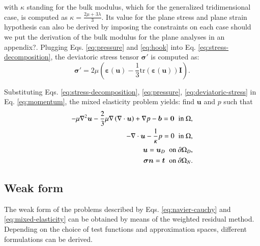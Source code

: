\documentclass[english,11pt,3p,number,sort&compress]{elsarticle}
\newcommand{\giovane}{\color{red}{\bf\Large GA} \color{cyan} }
\begin{document}
\noindent with $\kappa$ standing for the bulk modulus, which for the generalized tridimensional case, is computed as $\kappa=\frac{2\mu+3\lambda}{3}$. Its value for the plane stress and plane strain hypothesis can also be derived by imposing the constraints on each case {\giovane should we put the derivation of the bulk modulus for the plane analyses in an appendix?}. Plugging Eqs. \eqref{eq:pressure} and \eqref{eq:hook} into Eq. \eqref{eq:stress-decomposition}, the deviatoric stress tensor $\boldsymbol{\sigma}'$ is computed as:
\begin{equation} \label{eq:deviatoric-stress}
	\boldsymbol{\sigma}' = 2\mu \left(\boldsymbol{\varepsilon}(\bm{u}) - \frac{1}{3}\text{tr}(\boldsymbol{\varepsilon}(\bm{u}))\mathbf{I}\right) \text{.}
\end{equation}

Substituting Eqs. \eqref{eq:stress-decomposition}, \eqref{eq:pressure}, \eqref{eq:deviatoric-stress} in Eq. \eqref{eq:momentum}, the mixed elasticity problem yields: find $\mathbf{u}$ and $p$ such that
\begin{subequations} \label{eq:mixed-elasticity}
	\begin{align}
		-\mu\nabla^2\bm{u} -\frac{2}{3}\mu\nabla\left(\nabla \cdot \bm{u} \right) + \nabla p -\bm{b}= \bm{0} \hspace{0.2cm} \text{in } \Omega ,& \label{eq:mixed-elasticity-a}\\ 
		-\nabla \cdot \bm{u} -\frac{1}{\kappa}p= 0 \hspace{0.2cm} \text{in } \Omega ,& \label{eq:mixed-elasticity-b}\\ 
		\bm{u} = \bm{u}_D \hspace{0.2cm} \text{on } \partial\Omega_D ,&\\
		\bm{\sigma} \bm{n} = \bm{t} \hspace{0.2cm} \text{on } \partial\Omega_N .&
	\end{align}
\end{subequations}

\subsection{Weak form}

The weak form of the problems described by Eqs. \eqref{eq:navier-cauchy} and \eqref{eq:mixed-elasticity} can be obtained by means of the weighted residual method. Depending on the choice of test functions and approximation spaces, different formulations can be derived.
\end{document}
